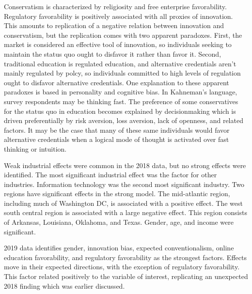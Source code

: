 \documentclass[AER]{./aea-latex-templates/AEA}
\begin{document}
        Conservatism is characterized by religiosity and free enterprise favorability.
        Regulatory favorability is positively associated with all proxies of innovation.
        This amounts to replication of a negative relation between innovation and conservatism,
        but the replication comes with two apparent paradoxes.
        First, the market is considered an effective tool of innovation\cite{baumol2002free},
        so individuals seeking to maintain the status quo ought to disfavor it rather than favor it.
        Second, traditional education is regulated education,
        and alternative credentials aren't mainly regulated by polcy,
        so individuals committed to high levels of regulation ought to disfavor
        alternative credentials.
        One explanation to these apparent paradoxes is based in personality and cognitive bias.
        In Kahneman's language\cite{kahneman2011thinking}, survey respondents may be thinking fast.
        The preference of some conservatives for the status quo in education becomes explained by
        decisionmaking which is driven preferentially by
        risk aversion, loss aversion, lack of openness, and related factors.
        It may be the case that many of these same individuals would favor alternative
        credentials when a logical mode of thought is activated over fast thinking or intuition.
        
        Weak industrial effects were common in the 2018 data, but no strong effects were identified.
        The most significant industrial effect was the factor for other industries. Information technology was the second most significant industry.
        Two regions have significant effects in the strong model.
        The mid-atlantic region, including much of Washington DC, is associated with a positive effect.
        The west south central region is associated with a large negative effect.
        This region consists of Arkansas, Louisiana, Oklahoma, and Texas\cite{uscensusbureau_2016}.
        Gender, age, and income were significant.
        
        2019 data identifies gender, innovation bias, expected
        conventionalism, online education favorability, and regulatory
        favorability as the strongest factors. Effects move in their expected directions,
        with the exception of regulatory favorability.
        This factor related positively to the variable of interest, replicating an unexpected 2018 finding which was earlier discussed.
        
\end{document}
